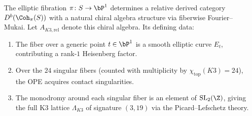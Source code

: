 \begin{construction}
\label{constr:k3e-relative-chiral}
The elliptic fibration $\pi \colon S \to \bP^1$ determines a relative derived category $D^b(\Coh_\pi(S))$ with a natural chiral algebra structure via fiberwise Fourier--Mukai. Let $A_{K3,\mathrm{rel}}$ denote this chiral algebra. Its defining data:
\begin{enumerate}[label=(\roman*)]
 \item The fiber over a generic point $t \in \bP^1$ is a smooth elliptic curve $E_t$, contributing a rank-$1$ Heisenberg factor.
 \item Over the $24$ singular fibers (counted with multiplicity by $\chi_{\mathrm{top}}(K3) = 24$), the OPE acquires contact singularities.
 \item The monodromy around each singular fiber is an element of $\mathrm{SL}_2(\Z)$, giving the full K3 lattice $\Lambda_{K3}$ of signature $(3,19)$ via the Picard--Lefschetz theory.
\end{enumerate}
\end{construction}

